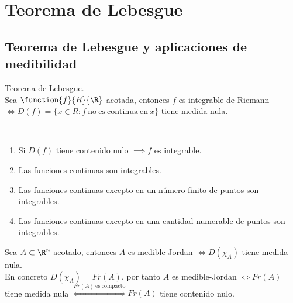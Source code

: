 \chapter{Teorema de Lebesgue}
	\section{Teorema de Lebesgue y aplicaciones de medibilidad}
	\begin{teor} Teorema de Lebesgue.\\
	Sea $\function{f}{R}{\R}$ acotada, entonces $f$ es integrable de Riemann$\iff D(f)=\{x\in R:f\ \mathrm{no\ es\ continua\ en\ }x\}$ tiene medida nula.
	\end{teor}
	
	\begin{observacion}\ 
	\begin{enumerate}[1)]
	\item  Si $D(f)$ tiene contenido nulo $\implies f$ es integrable.
	\item Las funciones continuas son integrables.
	\item Las funciones continuas excepto en un número finito de puntos son integrables.
	\item Las funciones continuas excepto en una cantidad numerable de puntos son integrables.
	\end{enumerate}	
	\end{observacion}
	
	\begin{corolario} Sea $A\subset\R^n$ acotado, entonces $A$ es medible-Jordan $\iff D(\chi_A)$ tiene medida nula.\\
	En concreto $D(\chi_A)=Fr(A)$, por tanto $A$ es medible-Jordan $\iff Fr(A)$ tiene medida nula $\overset{Fr(A)\ \mathrm{es\ compacto}}\iff Fr(A)$ tiene contenido nulo.
	\end{corolario}
	

